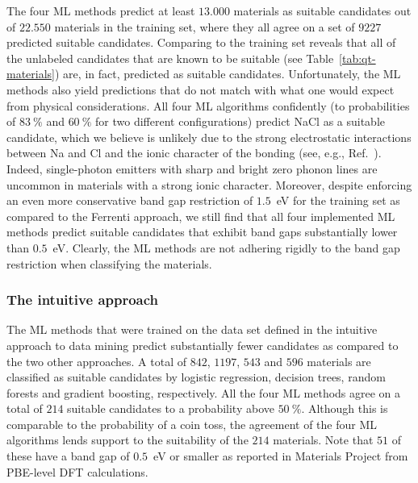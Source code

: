 \documentclass[superscriptaddress,unsortedaddress,
 amsmath,amssymb,
 aps,
]{revtex4-2}
\begin{document}
The four ML methods predict at least $13.000$ materials as suitable candidates out of $22.550$ materials in the training set, where they all agree on a set of $9227$ predicted suitable candidates. Comparing to the training set reveals that all of the unlabeled candidates that are known to be suitable (see Table~\ref{tab:qt-materials}) are, in fact, predicted as suitable candidates. Unfortunately, the ML methods also yield predictions that do not match with what one would expect from physical considerations. 
All four ML algorithms confidently (to probabilities of $83 \ \%$ and $60 \ \%$ for two different configurations) predict NaCl as a suitable candidate, which we believe is unlikely due to the strong electrostatic interactions between Na and Cl and the ionic character of the bonding (see, e.g., Ref.~\cite{Weber2010}).  
Indeed, single-photon emitters with sharp and bright zero phonon lines are uncommon in materials with a strong ionic character. 
Moreover, despite enforcing an even more conservative band gap restriction of $1.5$~eV for the training set as compared to the Ferrenti approach, we still find that all four implemented ML methods predict suitable candidates that exhibit band gaps substantially lower than $0.5$~eV.
Clearly, the ML methods are not adhering rigidly to the band gap restriction when classifying the materials. 
 
\subsubsection*{The intuitive approach}
The ML methods that were trained on the data set defined in the intuitive approach to data mining predict substantially fewer candidates as compared to the two other approaches. 
A total of $842$, $1197$, $543$ and $596$ materials are classified as suitable candidates by logistic regression, decision trees, random forests and gradient boosting, respectively. All the four ML methods agree on a total of $214$ suitable candidates to a probability above $50 \ \%$. 
Although this is comparable to the probability of a coin toss, the agreement of the four ML algorithms lends support to the suitability of the $214$ materials. 
Note that $51$ of these have a band gap of $0.5$~eV or smaller as reported in Materials Project from PBE-level DFT calculations.   

\end{document}
